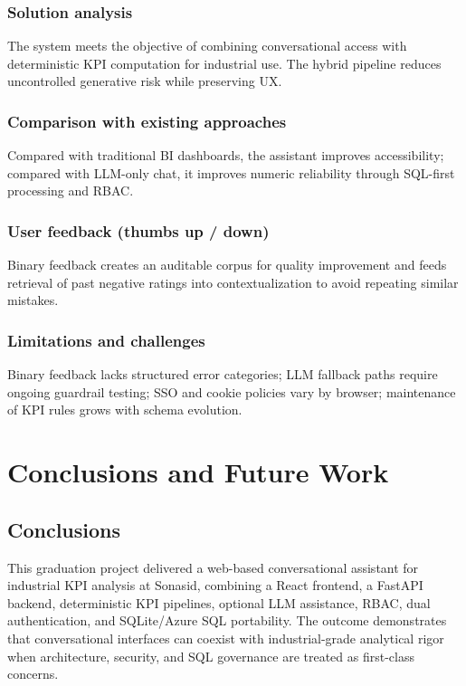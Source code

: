 \documentclass[12pt,a4paper,openany]{report}
\begin{document}
\subsection{Solution analysis}
The system meets the objective of combining conversational access with deterministic KPI computation for industrial use. The hybrid pipeline reduces uncontrolled generative risk while preserving UX.

\subsection{Comparison with existing approaches}
Compared with traditional BI dashboards, the assistant improves accessibility; compared with LLM-only chat, it improves numeric reliability through SQL-first processing and RBAC.

\subsection{User feedback (thumbs up / down)}
Binary feedback creates an auditable corpus for quality improvement and feeds retrieval of past negative ratings into contextualization to avoid repeating similar mistakes.

\subsection{Limitations and challenges}
Binary feedback lacks structured error categories; LLM fallback paths require ongoing guardrail testing; SSO and cookie policies vary by browser; maintenance of KPI rules grows with schema evolution.

\chapter{Conclusions and Future Work}

\section{Conclusions}
This graduation project delivered a web-based conversational assistant for industrial KPI analysis at Sonasid, combining a React frontend, a FastAPI backend, deterministic KPI pipelines, optional LLM assistance, RBAC, dual authentication, and SQLite/Azure SQL portability. The outcome demonstrates that conversational interfaces can coexist with industrial-grade analytical rigor when architecture, security, and SQL governance are treated as first-class concerns.
\end{document}
